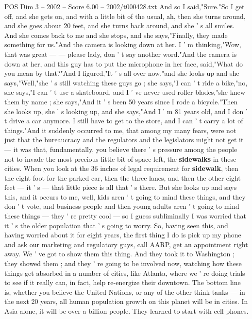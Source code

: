 \begin{textsample}{POS Dim 3 – 2002 – Score 6.00 – 2002/t000428.txt}
And so I said,"Sure."So I get off, and she gets on, and with a little bit of the usual, ah, then she turns around, and she goes about 20 feet, and she turns back around, and she ' s all smiles.
And she comes back to me and she stops, and she says,"Finally, they made something for us."And the camera is looking down at her.
I ' m thinking,"Wow, that was great — — please lady, don ' t say another word."And the camera is down at her, and this guy has to put the microphone in her face, said,"What do you mean by that?"And I figured,"It ' s all over now,"and she looks up and she says,"Well,"she ' s still watching these guys go ; she says,"I can ' t ride a bike,"no, she says,"I can ' t use a skateboard, and I ' ve never used roller blades,"she knew them by name ; she says,"And it ' s been 50 years since I rode a bicycle."Then she looks up, she ' s looking up, and she says,"And I ' m 81 years old, and I don ' t drive a car anymore.
I still have to get to the store, and I can ' t carry a lot of things."And it suddenly occurred to me, that among my many fears, were not just that the bureaucracy and the regulators and the legislators might not get it — it was that, fundamentally, you believe there ' s pressure among the people not to invade the most precious little bit of space left, the \textbf{sidewalks} in these cities.
When you look at the 36 inches of legal requirement for \textbf{sidewalk}, then the eight foot for the parked car, then the three lanes, and then the other eight feet — it ' s — that little piece is all that ' s there.
But she looks up and says this, and it occurs to me, well, kids aren ' t going to mind these things, and they don ' t vote, and business people and then young adults aren ' t going to mind these things — they ' re pretty cool — so I guess subliminally I was worried that it ' s the older population that ' s going to worry.
So, having seen this, and having worried about it for eight years, the first thing I do is pick up my phone and ask our marketing and regulatory guys, call AARP, get an appointment right away.
We ' ve got to show them this thing.
And they took it to Washington ; they showed them ; and they ' re going to be involved now, watching how these things get absorbed in a number of cities, like Atlanta, where we ' re doing trials to see if it really can, in fact, help re-energize their downtown.
The bottom line is, whether you believe the United Nations, or any of the other think tanks — in the next 20 years, all human population growth on this planet will be in cities.
In Asia alone, it will be over a billion people.
They learned to start with cell phones.

\end{textsample}
